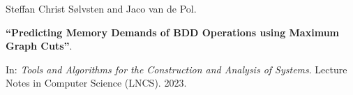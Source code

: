 Steffan Christ Sølvsten and Jaco van de Pol.

{\bf ``Predicting Memory Demands of BDD Operations using Maximum Graph Cuts''}.

In: \emph{Tools and Algorithms for the Construction and Analysis of Systems}.
Lecture Notes in Computer Science (LNCS). 2023.

